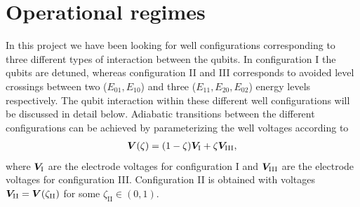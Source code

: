 \documentclass[twocolumn,superscriptaddress,unsortedaddress,
 amsmath,amssymb,
 aps,
]{revtex4-2}
\begin{document}
\section{Operational regimes}
    In this project we have been looking for well configurations corresponding to three different types of interaction between the qubits. In configuration I the qubits are detuned, whereas configuration II and III corresponds to avoided level crossings between two ($E_{01}, E_{10}$) and three ($E_{11}, E_{20}, E_{02}$) energy levels respectively. The qubit interaction within these different well configurations will be discussed in detail below. Adiabatic transitions between the different configurations can be achieved by parameterizing the well voltages according to
    \begin{align}
        \vb*{V}(\zeta) = (1-\zeta)\vb*{V}_\mathrm{I} + \zeta\vb*{V}_\mathrm{III},
        \label{eq:well-parameterization}
    \end{align}
    where $\vb*{V}_\mathrm{I}$ are the electrode voltages for configuration I and $\vb*{V}_\mathrm{III}$ are the electrode voltages for configuration III. Configuration II is obtained with voltages $\vb*{V}_\mathrm{II} = \vb*{V}(\zeta_\mathrm{II})$ for some $\zeta_\mathrm{II}\in(0,1)$. %
\end{document}
